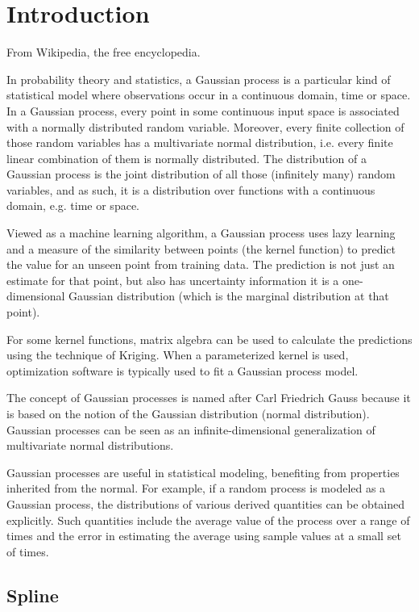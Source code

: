 

\section{Introduction}

From Wikipedia, the free encyclopedia.

In probability theory and statistics, a Gaussian process is a particular kind of statistical model where observations occur in a continuous domain, \eg time or space. In a Gaussian process, every point in some continuous input space is associated with a normally distributed random variable. Moreover, every finite collection of those random variables has a multivariate normal distribution, i.e. every finite linear combination of them is normally distributed. The distribution of a Gaussian process is the joint distribution of all those (infinitely many) random variables, and as such, it is a distribution over functions with a continuous domain, e.g. time or space. 


Viewed as a machine learning algorithm, a Gaussian process uses lazy learning and a measure of the similarity between points (the kernel function) to predict the value for an unseen point from training data. The prediction is not just an estimate for that point, but also has uncertainty information it is a one-dimensional Gaussian distribution (which is the marginal distribution at that point).

For some kernel functions, matrix algebra can be used to calculate the predictions using the technique of Kriging. When a parameterized kernel is used, optimization software is typically used to fit a Gaussian process model.

The concept of Gaussian processes is named after Carl Friedrich Gauss because it is based on the notion of the Gaussian distribution (normal distribution). Gaussian processes can be seen as an infinite-dimensional generalization of multivariate normal distributions.

Gaussian processes are useful in statistical modeling, benefiting from properties inherited from the normal. For example, if a random process is modeled as a Gaussian process, the distributions of various derived quantities can be obtained explicitly. Such quantities include the average value of the process over a range of times and the error in estimating the average using sample values at a small set of times.


\subsection{Spline}

